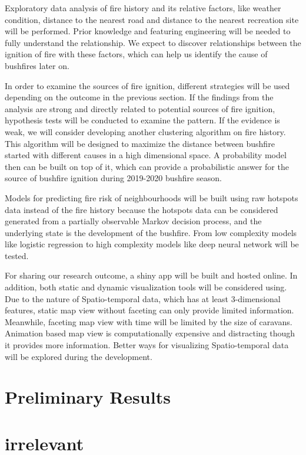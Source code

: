 \documentclass{monashthesis}
\begin{document}
Exploratory data analysis of fire history and its relative factors, like
weather condition, distance to the nearest road and distance to the
nearest recreation site will be performed. Prior knowledge and featuring
engineering will be needed to fully understand the relationship. We
expect to discover relationships between the ignition of fire with these
factors, which can help us identify the cause of bushfires later on.

In order to examine the sources of fire ignition, different strategies
will be used depending on the outcome in the previous section. If the
findings from the analysis are strong and directly related to potential
sources of fire ignition, hypothesis tests will be conducted to examine
the pattern. If the evidence is weak, we will consider developing
another clustering algorithm on fire history. This algorithm will be
designed to maximize the distance between bushfire started with
different causes in a high dimensional space. A probability model then
can be built on top of it, which can provide a probabilistic answer for
the source of bushfire ignition during 2019-2020 bushfire season.

Models for predicting fire risk of neighbourhoods will be built using
raw hotspots data instead of the fire history because the hotspots data
can be considered generated from a partially observable Markov decision
process, and the underlying state is the development of the bushfire.
From low complexity models like logistic regression to high complexity
models like deep neural network will be tested.

For sharing our research outcome, a shiny app will be built and hosted
online. In addition, both static and dynamic visualization tools will be
considered using. Due to the nature of Spatio-temporal data, which has
at least 3-dimensional features, static map view without faceting can
only provide limited information. Meanwhile, faceting map view with time
will be limited by the size of caravans. Animation based map view is
computationally expensive and distracting though it provides more
information. Better ways for visualizing Spatio-temporal data will be
explored during the development.

\section{Preliminary Results}\label{preliminary-results}

\newpage

\section{irrelevant}\label{irrelevant}
\end{document}
